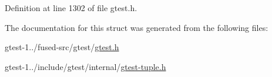 \-Definition at line 1302 of file gtest.\-h.



\-The documentation for this struct was generated from the following files\-:\begin{DoxyCompactItemize}
\item 
gtest-\/1../fused-\/src/gtest/\hyperlink{fused-src_2gtest_2gtest_8h}{gtest.\-h}\item 
gtest-\/1../include/gtest/internal/\hyperlink{gtest-tuple_8h}{gtest-\/tuple.\-h}\end{DoxyCompactItemize}
